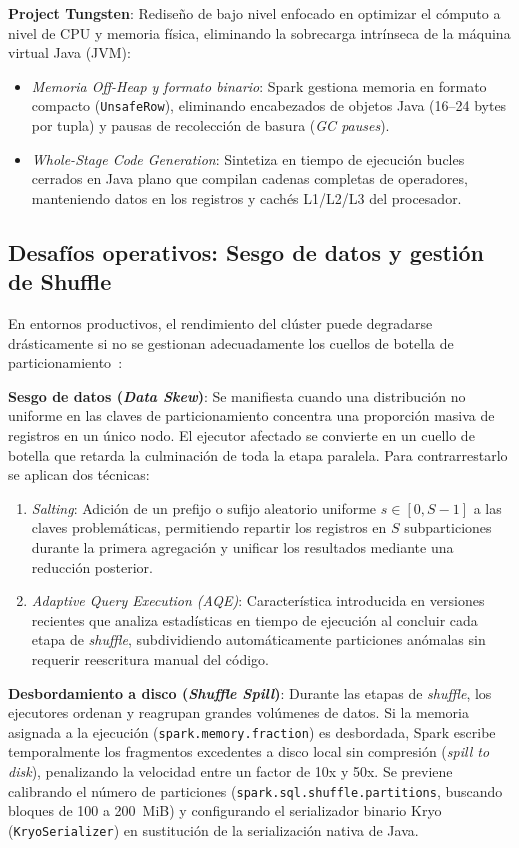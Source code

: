 \documentclass[conference,a4paper]{IEEEtran}
\begin{document}
\textbf{Project Tungsten}: Rediseño de bajo nivel enfocado en optimizar el cómputo a nivel de CPU y memoria física, eliminando la sobrecarga intrínseca de la máquina virtual Java (JVM):
\begin{itemize}
\item \textit{Memoria Off-Heap y formato binario}: Spark gestiona memoria en formato compacto (\texttt{UnsafeRow}), eliminando encabezados de objetos Java (16--24 bytes por tupla) y pausas de recolección de basura (\textit{GC pauses}).
\item \textit{Whole-Stage Code Generation}: Sintetiza en tiempo de ejecución bucles cerrados en Java plano que compilan cadenas completas de operadores, manteniendo datos en los registros y cachés L1/L2/L3 del procesador.
\end{itemize}

\subsection{Desafíos operativos: Sesgo de datos y gestión de Shuffle}

En entornos productivos, el rendimiento del clúster puede degradarse drásticamente si no se gestionan adecuadamente los cuellos de botella de particionamiento~\cite{spark-tuning}:

\textbf{Sesgo de datos (\textit{Data Skew})}: Se manifiesta cuando una distribución no uniforme en las claves de particionamiento concentra una proporción masiva de registros en un único nodo. El ejecutor afectado se convierte en un cuello de botella que retarda la culminación de toda la etapa paralela. Para contrarrestarlo se aplican dos técnicas:
\begin{enumerate}
\item \textit{Salting}: Adición de un prefijo o sufijo aleatorio uniforme $s \in [0, S-1]$ a las claves problemáticas, permitiendo repartir los registros en $S$ subparticiones durante la primera agregación y unificar los resultados mediante una reducción posterior.
\item \textit{Adaptive Query Execution (AQE)}: Característica introducida en versiones recientes que analiza estadísticas en tiempo de ejecución al concluir cada etapa de \textit{shuffle}, subdividiendo automáticamente particiones anómalas sin requerir reescritura manual del código.
\end{enumerate}

\textbf{Desbordamiento a disco (\textit{Shuffle Spill})}: Durante las etapas de \textit{shuffle}, los ejecutores ordenan y reagrupan grandes volúmenes de datos. Si la memoria asignada a la ejecución (\texttt{spark.memory.fraction}) es desbordada, Spark escribe temporalmente los fragmentos excedentes a disco local sin compresión (\textit{spill to disk}), penalizando la velocidad entre un factor de 10x y 50x. Se previene calibrando el número de particiones (\texttt{spark.sql.shuffle.partitions}, buscando bloques de 100 a 200~MiB) y configurando el serializador binario Kryo (\texttt{KryoSerializer}) en sustitución de la serialización nativa de Java.
\end{document}
